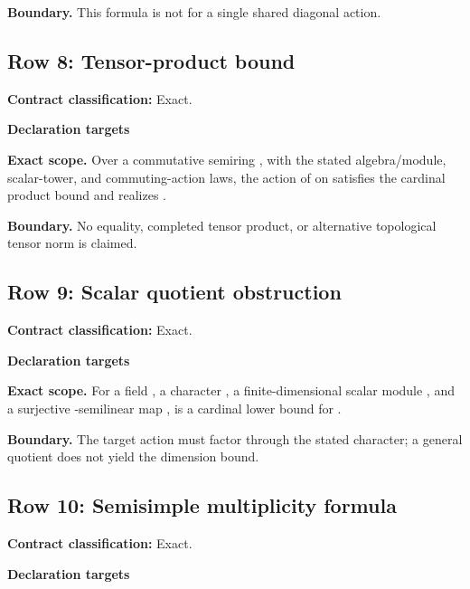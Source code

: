 \par\smallskip\noindent\textbf{Boundary.} This formula is not for a single shared diagonal action.
\medskip
{}\subsection{Row 8: Tensor-product bound}
\label{row:8}
\textbf{Contract classification:} Exact.
\par\smallskip\textbf{Declaration targets}\par
{\small\noindent{}\par}
{\small\noindent{}\par}
\medskip\noindent\textbf{Exact scope.} Over a commutative semiring , with the stated algebra/module, scalar-tower, and commuting-action laws, the action of  on  satisfies the cardinal product bound and realizes .
\par\smallskip\noindent\textbf{Boundary.} No equality, completed tensor product, or alternative topological tensor norm is claimed.
\medskip
{}\subsection{Row 9: Scalar quotient obstruction}
\label{row:9}
\textbf{Contract classification:} Exact.
\par\smallskip\textbf{Declaration targets}\par
{\small\noindent{}\par}
\medskip\noindent\textbf{Exact scope.} For a field , a character , a finite-dimensional scalar module , and a surjective -semilinear map ,  is a cardinal lower bound for .
\par\smallskip\noindent\textbf{Boundary.} The target action must factor through the stated character; a general quotient does not yield the dimension bound.
\medskip
{}\subsection{Row 10: Semisimple multiplicity formula}
\label{row:10}
\textbf{Contract classification:} Exact.
\par\smallskip\textbf{Declaration targets}\par

